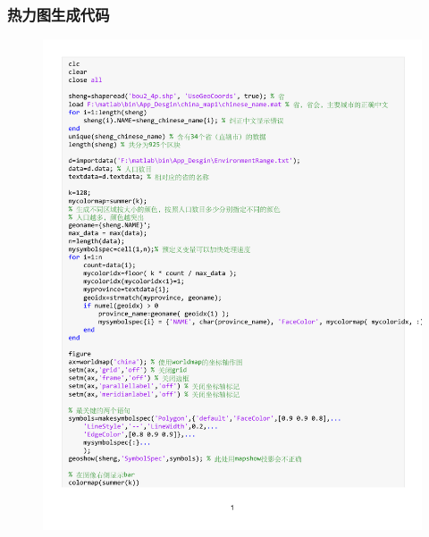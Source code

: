 \documentclass[UTF8]{ctexart}
\begin{document}
\subsubsection{热力图生成代码}
\begin{figure}[H] %
    \centering %
    \includegraphics[width=1.2\textwidth]{./code/ChinaMap.pdf} %
\end{figure}
\end{document}
